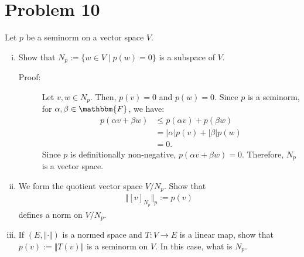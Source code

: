 \documentclass[10pt]{extarticle}
\begin{document}
  \section{Problem 10}%
  Let $p$ be a seminorm on a vector space $V$.
  \begin{enumerate}[(i)]
    \item Show that $N_p := \{w\in V\mid p(w)=0\}$ is a subspace of $V$.
      \begin{description}
        \item[Proof:] Let $v,w\in N_p$. Then, $p(v) = 0$ and $p(w) = 0$. Since $p$ is a seminorm, for $\alpha,\beta\in \mathbbm{F}$, we have:
          \begin{align*}
            p(\alpha v + \beta w) &\leq p(\alpha v) + p(\beta w)\\
                                  &= |\alpha| p(v) + |\beta|p(w)\\
                                  &= 0.
          \end{align*}
          Since $p$ is definitionally non-negative, $p(\alpha v + \beta w) = 0$. Therefore, $N_p$ is a vector space.
      \end{description}
    \item We form the quotient vector space $V/N_p$. Show that
      \begin{align*}
        \Vert [v]_{N_p}\Vert_{p} := p(v)
      \end{align*}
      defines a norm on $V/N_p$.
    \item If $(E,\Vert\cdot\Vert)$ is a normed space and $T: V\rightarrow E$ is a linear map, show that $p(v) := \Vert T(v)\Vert$ is a seminorm on $V$. In this case, what is $N_p$.
  \end{enumerate}
\end{document}
